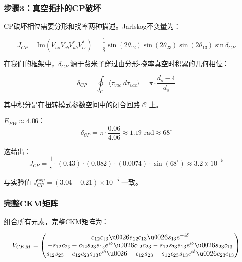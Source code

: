 \subsubsection{步骤3：真空拓扑的CP破坏}

CP破坏相位需要分形和挠率两种描述。Jarlskog不变量为：

\begin{equation}
    J_{CP} = \text{Im}(V_{us} V_{cb} V_{ub}^* V_{cs}^*) = \frac{1}{8} \sin(2\theta_{12}) \sin(2\theta_{23}) \sin(2\theta_{13}) \sin\delta_{CP}
\end{equation}

在我们的框架中，$\delta_{CP}$ 源于费米子穿过由分形-挠率真空时积累的几何相位：

\begin{equation}
    \delta_{CP} = \oint_\mathcal{C} \langle \tau_{vac} | d\tau_{vac} \rangle = \pi \cdot \frac{d_s - 4}{d_s}
\end{equation}

其中积分是在扭转模式参数空间中的闭合回路 $\mathcal{C}$ 上。

$E_{EW} \approx 4.06$：
\begin{equation}
    \delta_{CP} = \pi \cdot \frac{0.06}{4.06} \approx 1.19 \text{ rad} \approx 68^\circ
\end{equation}

这给出：
\begin{equation}
    J_{CP} = \frac{1}{8} \cdot (0.43) \cdot (0.082) \cdot (0.0074) \cdot \sin(68^\circ) \approx 3.2 \times 10^{-5}
\end{equation}

与实验值 $J_{CP}^{exp} = (3.04 \pm 0.21) \times 10^{-5}$ 一致。

\subsubsection{完整CKM矩阵}

组合所有元素，完整CKM矩阵为：

\begin{equation}
    V_{CKM} = 
    \begin{pmatrix}
        c_{12}c_{13} \u0026 s_{12}c_{13} \u0026 s_{13}e^{-i\delta} \\
        -s_{12}c_{23} - c_{12}s_{23}s_{13}e^{i\delta} \u0026 c_{12}c_{23} - s_{12}s_{23}s_{13}e^{i\delta} \u0026 s_{23}c_{13} \\
        s_{12}s_{23} - c_{12}c_{23}s_{13}e^{i\delta} \u0026 -c_{12}s_{23} - s_{12}c_{23}s_{13}e^{i\delta} \u0026 c_{23}c_{13}
    \end{pmatrix}
\end{equation}

